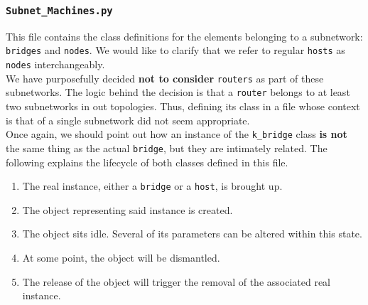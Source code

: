 \subsubsection{\texttt{Subnet\_Machines.py}}
    This file contains the class definitions for the elements belonging to a subnetwork: \texttt{bridges} and \texttt{nodes}. We would like to clarify that we refer to regular \texttt{hosts} as \texttt{nodes} interchangeably.\\

    We have purposefully decided \textbf{not to consider} \texttt{routers} as part of these subnetworks. The logic behind the decision is that a \texttt{router} belongs to at least two subnetworks in out topologies. Thus, defining its class in a file whose context is that of a single subnetwork did not seem appropriate.\\

    Once again, we should point out how an instance of the \texttt{k\_bridge} class \textbf{is not} the same thing as the actual \texttt{bridge}, but they are intimately related. The following explains the lifecycle of both classes defined in this file.\\

    \begin{enumerate}
        \item The real instance, either a \texttt{bridge} or a \texttt{host}, is brought up.
        \item The object representing said instance is created.
        \item The object sits idle. Several of its parameters can be altered within this state.
        \item At some point, the object will be dismantled.
        \item The release of the object will trigger the removal of the associated real instance.
    \end{enumerate}

